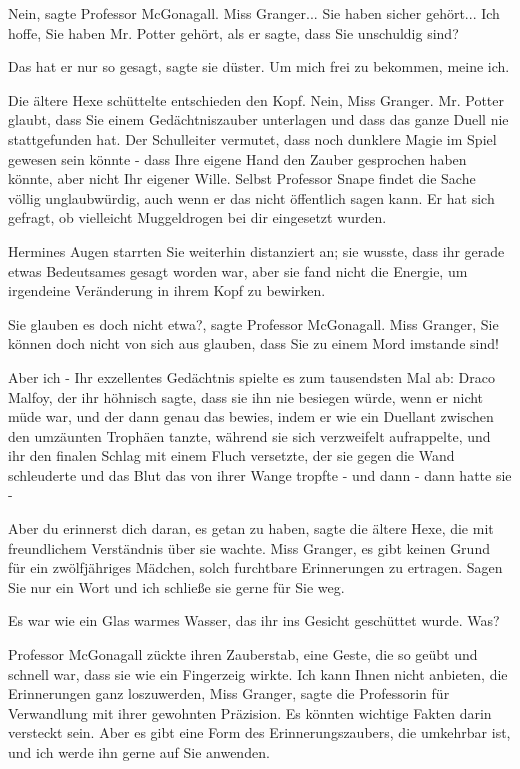 \glqq{}Nein\grqq{}, sagte Professor McGonagall. \glqq{}Miss Granger... Sie haben
sicher gehört... Ich hoffe, Sie haben Mr. Potter gehört, als er sagte, dass Sie
unschuldig sind?\grqq{}

\glqq{}Das hat er nur so gesagt\grqq{}, sagte sie düster. \glqq{}Um mich frei zu
bekommen, meine ich.\grqq{}

Die ältere Hexe schüttelte entschieden den Kopf. \glqq{}Nein, Miss Granger. Mr.
Potter glaubt, dass Sie einem Gedächtniszauber unterlagen und dass das ganze
Duell nie stattgefunden hat. Der Schulleiter vermutet, dass noch dunklere Magie
im Spiel gewesen sein könnte - dass Ihre eigene Hand den Zauber gesprochen haben
könnte, aber nicht Ihr eigener Wille. Selbst Professor Snape findet die Sache
völlig unglaubwürdig, auch wenn er das nicht öffentlich sagen kann. Er hat sich
gefragt, ob vielleicht Muggeldrogen bei dir eingesetzt wurden.\grqq{}

Hermines Augen starrten Sie weiterhin distanziert an; sie wusste, dass ihr
gerade etwas Bedeutsames gesagt worden war, aber sie fand nicht die Energie, um
irgendeine Veränderung in ihrem Kopf zu bewirken.

\glqq{}Sie glauben es doch nicht etwa?\grqq{}, sagte Professor McGonagall. \glqq{}
Miss Granger, Sie können doch nicht von sich aus glauben, dass Sie zu einem Mord
imstande sind!\grqq{}

\glqq{}Aber ich -\grqq{} Ihr exzellentes Gedächtnis spielte es zum tausendsten
Mal ab: Draco Malfoy, der ihr höhnisch sagte, dass sie ihn nie besiegen würde,
wenn er nicht müde war, und der dann genau das bewies, indem er wie ein Duellant
zwischen den umzäunten Trophäen tanzte, während sie sich verzweifelt
aufrappelte, und ihr den finalen Schlag mit einem Fluch versetzte, der sie gegen
die Wand schleuderte und das Blut das von ihrer Wange tropfte - und dann - dann
hatte sie -

\glqq{}Aber du erinnerst dich daran, es getan zu haben\grqq{}, sagte die ältere
Hexe, die mit freundlichem Verständnis über sie wachte. \glqq{}Miss Granger, es
gibt keinen Grund für ein zwölfjähriges Mädchen, solch furchtbare Erinnerungen
zu ertragen. Sagen Sie nur ein Wort und ich schließe sie gerne für Sie
weg.\grqq{}

Es war wie ein Glas warmes Wasser, das ihr ins Gesicht geschüttet wurde. \glqq{}
Was?\grqq{}

Professor McGonagall zückte ihren Zauberstab, eine Geste, die so geübt und
schnell war, dass sie wie ein Fingerzeig wirkte. \glqq{}Ich kann Ihnen nicht
anbieten, die Erinnerungen ganz loszuwerden, Miss Granger\grqq{}, sagte die
Professorin für Verwandlung mit ihrer gewohnten Präzision. \glqq{}Es könnten
wichtige Fakten darin versteckt sein. Aber es gibt eine Form des
Erinnerungszaubers, die umkehrbar ist, und ich werde ihn gerne auf Sie
anwenden.\grqq{}

